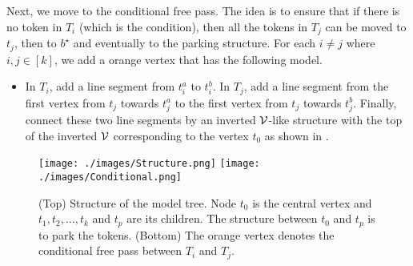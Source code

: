 Next, we move to the conditional free pass.
The idea is to ensure that if there is no token in $T_i$
(which is the condition), then all the tokens in $T_j$
can be moved to $t_j$, then to $b^{\star}$ and eventually
to the parking structure.
For each $i\neq j$ where $i,j\in [k]$, we add a orange vertex that has the following model.
\begin{itemize}
\item In $T_i$, add a line segment from $t_i^a$ to $t_i^b$.
In $T_j$, add a line segment from the first vertex from $t_j$ towards
$t_j^a$ to the first vertex from $t_j$ towards $t_j^b$.
Finally, connect these two line segments by an inverted $\mathcal{V}$-like
structure with the top of the inverted $\mathcal{V}$ corresponding to the vertex
$t_0$ as shown in .
\end{itemize}

\begin{figure}[t]
    \centering
    \texttt{[image: ./images/Structure.png]}
    \texttt{[image: ./images/Conditional.png]}
    \caption{(Top) Structure of the model tree. Node $t_0$ is the central vertex and $t_1, t_2, \dots, t_k$ and $t_p$ are its children.
     The structure between $t_0$ and $t_p$ is to park the tokens.
     (Bottom) The orange vertex denotes the conditional free pass
     between $T_i$ and $T_j$.
     \label{structure}}
     \vspace{-5mm}
\end{figure}

